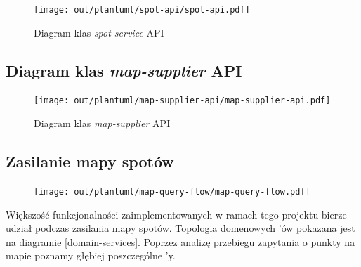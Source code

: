 \begin{figure}[H]
	\begin{center}
		\texttt{[image: out/plantuml/spot-api/spot-api.pdf]}
	\end{center}
    \caption{Diagram klas \emph{spot-service} API}
    \label{spot-api}
\end{figure}

\subsection{Diagram klas \emph{map-supplier} API}

\begin{figure}[H]
	\begin{center}
		\texttt{[image: out/plantuml/map-supplier-api/map-supplier-api.pdf]}
	\end{center}
    \caption{Diagram klas \emph{map-supplier} API}
    \label{ms-api}
\end{figure}

\newpage

\subsection{Zasilanie mapy spotów}

\begin{figure}[H]
	\begin{center}
		\texttt{[image: out/plantuml/map-query-flow/map-query-flow.pdf]}
	\end{center}
\end{figure}

Większość funkcjonalności zaimplementowanych w ramach tego projektu bierze udział podczas zasilania mapy spotów.
Topologia domenowych 'ów pokazana jest na diagramie \ref{domain-services}. 
Poprzez analizę przebiegu zapytania o punkty na mapie poznamy głębiej poszczególne 'y.


